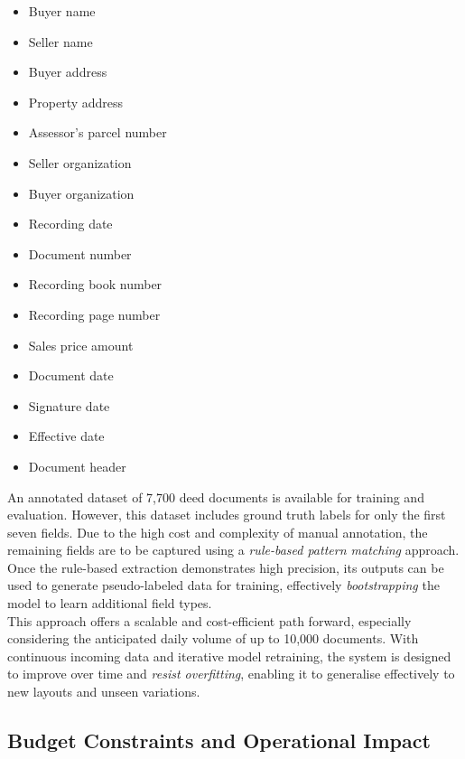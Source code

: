 \documentclass{article}
\begin{document}
\begin{multicols}{2}
\begin{itemize}
    \item Buyer name
    \item Seller name
    \item Buyer address
    \item Property address
    \item Assessor's parcel number
    \item Seller organization
    \item Buyer organization
    \item Recording date
    \item Document number
    \item Recording book number
    \item Recording page number
    \item Sales price amount
    \item Document date
    \item Signature date
    \item Effective date
    \item Document header
\end{itemize}
\end{multicols}

An annotated dataset of 7,700 deed documents is available for training and evaluation. However, this dataset includes ground truth labels for only the first seven fields. Due to the high cost and complexity of manual annotation, the remaining fields are to be captured using a \textit{rule-based pattern matching} approach. Once the rule-based extraction demonstrates high precision, its outputs can be used to generate pseudo-labeled data for training, effectively \textit{bootstrapping} the model to learn additional field types. \\

This approach offers a scalable and cost-efficient path forward, especially considering the anticipated daily volume of up to 10,000 documents. With continuous incoming data and iterative model retraining, the system is designed to improve over time and \textit{resist overfitting}, enabling it to generalise effectively to new layouts and unseen variations.

\subsection{Budget Constraints and Operational Impact}
\end{document}
